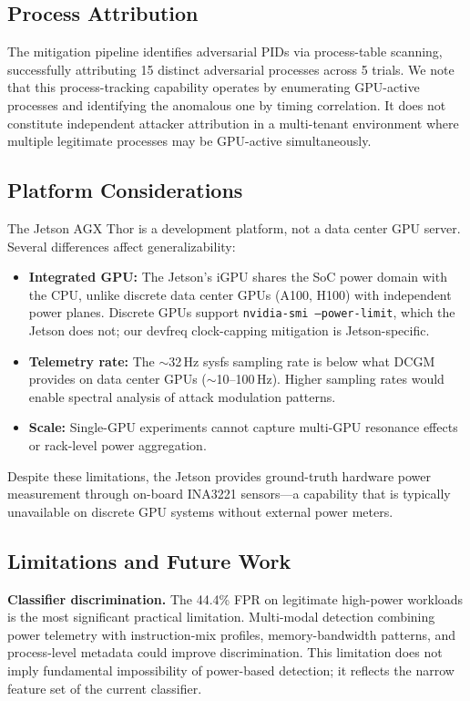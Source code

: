 \documentclass[conference]{IEEEtran}
\begin{document}
\subsection{Process Attribution}

The mitigation pipeline identifies adversarial PIDs via process-table
scanning, successfully attributing 15 distinct adversarial processes
across 5 trials.  We note that this process-tracking capability
operates by enumerating GPU-active processes and identifying the
anomalous one by timing correlation.  It does not constitute
independent attacker attribution in a multi-tenant environment where
multiple legitimate processes may be GPU-active simultaneously.

\subsection{Platform Considerations}

The Jetson AGX Thor is a development platform, not a data center GPU
server.  Several differences affect generalizability:

\begin{itemize}
\item \textbf{Integrated GPU:} The Jetson's iGPU shares the SoC
  power domain with the CPU, unlike discrete data center GPUs (A100,
  H100) with independent power planes.  Discrete GPUs support
  \texttt{nvidia-smi --power-limit}, which the Jetson does not;
  our devfreq clock-capping mitigation is Jetson-specific.
\item \textbf{Telemetry rate:} The $\sim$32\,Hz sysfs sampling rate is
  below what DCGM provides on data center GPUs ($\sim$10--100\,Hz).
  Higher sampling rates would enable spectral analysis of attack
  modulation patterns.
\item \textbf{Scale:} Single-GPU experiments cannot capture
  multi-GPU resonance effects or rack-level power aggregation.
\end{itemize}

Despite these limitations, the Jetson provides ground-truth hardware
power measurement through on-board INA3221 sensors---a capability
that is typically unavailable on discrete GPU systems without external
power meters.

\subsection{Limitations and Future Work}

\textbf{Classifier discrimination.}  The 44.4\% FPR on legitimate
high-power workloads is the most significant practical limitation.
Multi-modal detection combining power telemetry with instruction-mix
profiles, memory-bandwidth patterns, and process-level metadata could
improve discrimination.  This limitation does not imply fundamental
impossibility of power-based detection; it reflects the narrow feature
set of the current classifier.
\end{document}
